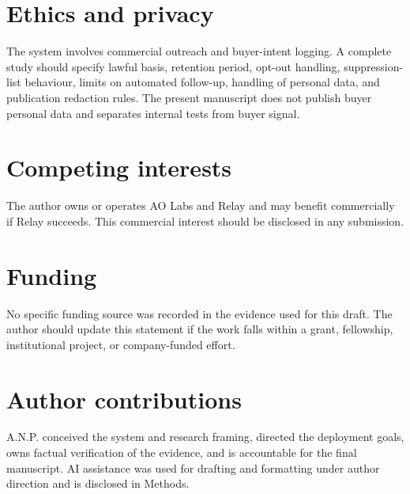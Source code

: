\documentclass[12pt,letterpaper]{article}
\begin{document}
\section{Ethics and privacy}

The system involves commercial outreach and buyer-intent logging. A complete study should specify lawful basis, retention period, opt-out handling, suppression-list behaviour, limits on automated follow-up, handling of personal data, and publication redaction rules. The present manuscript does not publish buyer personal data and separates internal tests from buyer signal.

\section{Competing interests}

The author owns or operates AO Labs and Relay and may benefit commercially if Relay succeeds. This commercial interest should be disclosed in any submission.

\section{Funding}

No specific funding source was recorded in the evidence used for this draft. The author should update this statement if the work falls within a grant, fellowship, institutional project, or company-funded effort.

\section{Author contributions}

A.N.P. conceived the system and research framing, directed the deployment goals, owns factual verification of the evidence, and is accountable for the final manuscript. AI assistance was used for drafting and formatting under author direction and is disclosed in Methods.

\printbibliography
\end{document}
